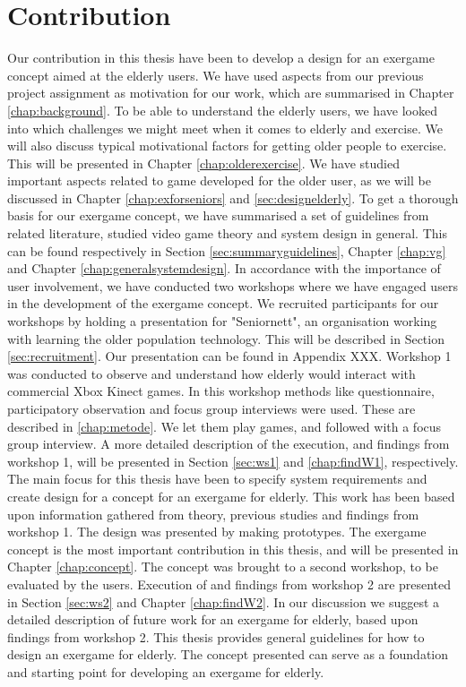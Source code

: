 \section{Contribution}
Our contribution in this thesis have been to develop a design for an exergame concept aimed at the elderly users. We have used aspects from our previous project assignment as motivation for our work, which are summarised in Chapter \ref{chap:background}. To be able to understand the elderly users, we have looked into which challenges we might meet when it comes to elderly and exercise. We will also discuss typical motivational factors for getting older people to exercise. This will be presented in Chapter \ref{chap:olderexercise}. We have studied important aspects related to game developed for the older user, as we will be discussed in Chapter \ref{chap:exforseniors} and \ref{sec:designelderly}. To get a thorough basis for our exergame concept, we have summarised a set of guidelines from related literature, studied video game theory and system design in general. This can be found respectively in Section \ref{sec:summaryguidelines}, Chapter \ref{chap:vg} and Chapter \ref{chap:generalsystemdesign}. In accordance with the importance of user involvement, we have conducted two workshops where we have engaged users in the development of the exergame concept. We recruited participants for our workshops by holding a presentation for "Seniornett", an organisation working with learning the older population technology. This will be described in Section \ref{sec:recruitment}. Our presentation can be found in Appendix XXX. Workshop 1 was conducted to observe and understand how elderly would interact with commercial Xbox Kinect games. In this workshop methods like questionnaire, participatory observation and focus group interviews were used. These are described in \ref{chap:metode}. We let them play games, and followed with a focus group interview. A more detailed description of the execution, and findings from workshop 1, will be presented in Section \ref{sec:ws1} and \ref{chap:findW1}, respectively. The main focus for this thesis have been to specify system requirements and create design for a concept for an exergame for elderly. This work has been based upon information gathered from theory, previous studies and findings from workshop 1. The design was presented by making prototypes. The exergame concept is the most important contribution in this thesis, and will be presented in Chapter \ref{chap:concept}. The concept was brought to a second workshop, to be evaluated by the users. Execution of and findings from workshop 2 are presented in Section \ref{sec:ws2} and Chapter \ref{chap:findW2}. In our discussion we suggest a detailed description of future work for an exergame for elderly, based upon findings from workshop 2. This thesis provides general guidelines for how to design an exergame for elderly. The concept presented can serve as a foundation and starting point for developing an exergame for elderly.     

